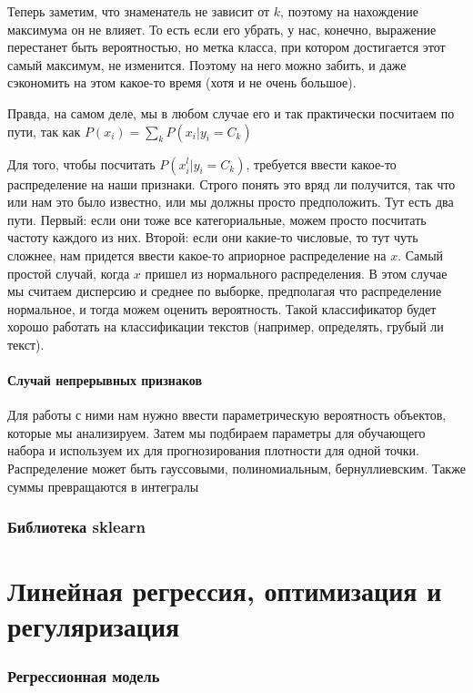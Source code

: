 \documentclass[a4paper, 14pt]{article}
\begin{document}
    Теперь заметим, что знаменатель не зависит от $k$, поэтому на нахождение максимума он не влияет.
    То есть если его убрать, у нас, конечно, выражение перестанет быть вероятностью, но метка класса, при котором
    достигается этот самый максимум, не изменится.
    Поэтому на него можно забить, и даже сэкономить на этом какое-то время (хотя и не очень большое).
    
    Правда, на самом деле, мы в любом случае его и так практически посчитаем по пути, так как
    $P(x_i) = \sum_k P(x_i | y_i = C_k) $
    
    Для того, чтобы посчитать $P(x^l_i|y_i = C_k)$, требуется ввести какое-то распределение на наши признаки.
    Строго понять это вряд ли получится, так что или нам это было известно, или мы должны просто предположить.
    Тут есть два пути.
    Первый: если они тоже все категориальные, можем просто посчитать частоту каждого из них.
    Второй: если они какие-то числовые, то тут чуть сложнее, нам придется ввести какое-то априорное распределение на $x$.
    Самый простой случай, когда $x$ пришел из нормального распределения.
    В этом случае мы считаем дисперсию и среднее по выборке, предполагая что распределение нормальное, и тогда можем
    оценить вероятность.
    Такой классификатор будет хорошо работать на классификации текстов (например, определять, грубый ли текст).
    
    \subsection{Случай непрерывных признаков}
    
    Для работы с ними нам нужно ввести параметрическую вероятность объектов, которые мы анализируем.
    Затем мы подбираем параметры для обучающего набора и используем их для прогнозирования плотности для одной точки.
    Распределение может быть гауссовыми, полиномиальным, бернуллиевским.
    Также суммы превращаются в интегралы
    
    \section{Библиотека sklearn}
    
    
    \part{Линейная регрессия, оптимизация и регуляризация}
    
    \section{Регрессионная модель}
    
\end{document}
